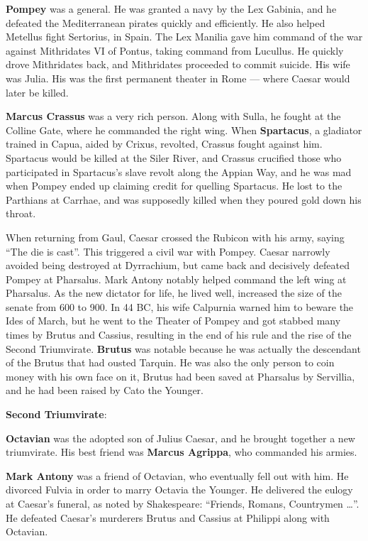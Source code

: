 \textbf{Pompey} was a general. He was granted a navy by the Lex Gabinia, and he defeated
the Mediterranean pirates quickly and efficiently.
He also helped Metellus fight Sertorius, in Spain.
The Lex Manilia gave him command of the war against Mithridates VI of Pontus, taking command from Lucullus.
He quickly drove Mithridates back, and Mithridates proceeded to commit suicide.
His wife was Julia.
His was the first permanent theater in Rome --- where Caesar would later be killed.

\textbf{Marcus Crassus} was a very rich person.
Along with Sulla, he fought at the Colline Gate, where he commanded the right wing.
When \textbf{Spartacus}, a gladiator trained in Capua, aided by Crixus, revolted, Crassus fought against him.
Spartacus would be killed at the Siler River, and
Crassus crucified those who participated in Spartacus's slave revolt along the Appian Way,
and he was mad when Pompey ended up claiming credit for quelling Spartacus.
He lost to the Parthians at Carrhae, and was supposedly killed when they poured gold down his throat.

When returning from Gaul, Caesar crossed the Rubicon with his army, saying ``The die is cast''.
This triggered a civil war with Pompey.
Caesar narrowly avoided being destroyed at Dyrrachium, but came back and decisively defeated Pompey at Pharsalus.
Mark Antony notably helped command the left wing at Pharsalus.
As the new dictator for life, he lived well, increased the size of the senate from 600 to 900.
In 44 BC, his wife Calpurnia warned him to beware the Ides of March,
but he went to the Theater of Pompey and got stabbed many times by Brutus and Cassius,
resulting in the end of his rule and the rise of the Second Triumvirate.
\textbf{Brutus} was notable because he was actually the descendant of the Brutus that had ousted Tarquin.
He was also the only person to coin money with his own face on it,
Brutus had been saved at Pharsalus by Servillia, and he had been raised by Cato the Younger.

\textbf{Second Triumvirate}:

\textbf{Octavian} was the adopted son of Julius Caesar, and he brought together a new triumvirate.
His best friend was \textbf{Marcus Agrippa}, who commanded his armies.

\textbf{Mark Antony} was a friend of Octavian, who eventually fell out with him.
He divorced Fulvia in order to marry Octavia the Younger.
He delivered the eulogy at Caesar's funeral, as noted by Shakespeare:
``Friends, Romans, Countrymen \ldots''.
He defeated Caesar's murderers Brutus and Cassius at Philippi along with Octavian.

